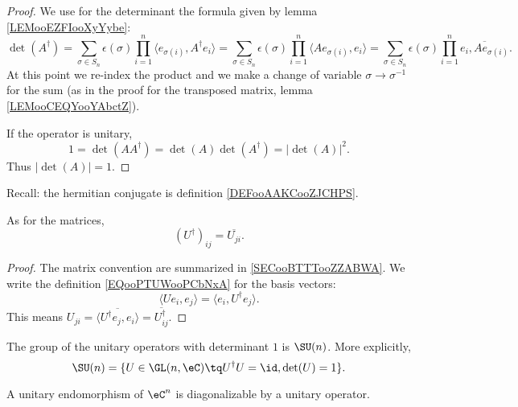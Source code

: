 \begin{proof}
    We use for the determinant the formula given by lemma \ref{LEMooEZFIooXyYybe}:
    \begin{equation}
        \det(A^{\dag})=\sum_{\sigma\in S_n}\epsilon(\sigma)\prod_{i=1}^n\langle e_{\sigma(i)}, A^{\dag}e_i\rangle =  \sum_{\sigma\in S_n}\epsilon(\sigma)\prod_{i=1}^n \langle Ae_{\sigma(i)}, e_i\rangle = \sum_{\sigma\in S_n}\epsilon(\sigma)\prod_{i=1}^n\overline{ e_i,Ae_{\sigma(i)} }.
    \end{equation}
    At this point we re-index the product and we make a change of variable $\sigma\to \sigma^{-1}$ for the sum (as in the proof for the transposed matrix, lemma \ref{LEMooCEQYooYAbctZ}).

    If the operator is unitary,
    \begin{equation}
        1=\det(AA^{\dag})=\det(A)\det(A^{\dag})=| \det(A) |^2.
    \end{equation}
    Thus \( | \det(A) |=1\).
\end{proof}

Recall: the hermitian conjugate is definition \ref{DEFooAAKCooZJCHPS}.
\begin{lemma}
    As for the matrices,
    \begin{equation}
        (U^{\dag})_{ij}=\overline{ U_{ji} }.
    \end{equation}
\end{lemma}

\begin{proof}
    The matrix convention are summarized in \ref{SECooBTTTooZZABWA}. We write the definition \eqref{EQooPTUWooPCbNxA} for the basis vectors:
    \begin{equation}
        \langle Ue_i, e_j\rangle =\langle e_i, U^{\dag}e_j\rangle .
    \end{equation}
    This means \( U_{ji}=\overline{ \langle U^{\dag}e_j, e_i\rangle  }=\overline{ U^{\dag}_{ij} }\).
\end{proof}

\begin{definition}        \label{DEFooVIQUooQbnYMu}
    The group of the unitary operators with determinant \( 1\) is \( \SU(n)\). More explicitly,
    \begin{equation}
        \SU(n)=\{U\in \GL(n,\eC)\tq U^{\dag}U=\id,\det(U)=1\}.
    \end{equation}
\end{definition}

\begin{proposition}     \label{PROPooYXPRooBgikdE}
    A unitary endomorphism of \( \eC^n\) is diagonalizable by a unitary operator.
\end{proposition}

